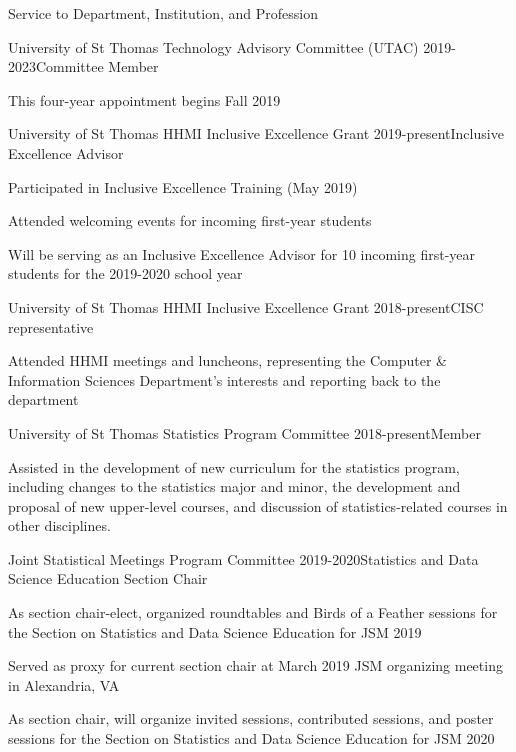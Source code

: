 \documentclass{resume} %
\begin{document}
\begin{rSection}{Service to Department, Institution, and Profession}

\begin{rSubsection}{University of St Thomas Technology Advisory Committee (UTAC)}{ }{2019-2023}{Committee Member}
\item This four-year appointment begins Fall 2019
\end{rSubsection}

\begin{rSubsection}{University of St Thomas HHMI Inclusive Excellence Grant}{ }{2019-present}{Inclusive Excellence Advisor}
\item Participated in Inclusive Excellence Training (May 2019)
\item Attended welcoming events for incoming first-year students
\item Will be serving as an Inclusive Excellence Advisor for 10 incoming first-year students for the 2019-2020 school year
\end{rSubsection}

\begin{rSubsection}{University of St Thomas HHMI Inclusive Excellence Grant}{ }{2018-present}{CISC representative}
\item Attended HHMI meetings and luncheons, representing the Computer \& Information Sciences Department's interests and reporting back to the department
\end{rSubsection}

\begin{rSubsection}{University of St Thomas Statistics Program Committee}{ }{2018-present}{Member}
\item Assisted in the development of new curriculum for the statistics program, including changes to the statistics major and minor, the development and proposal of new upper-level courses, and discussion of statistics-related courses in other disciplines. 
\end{rSubsection}

\begin{rSubsection}{Joint Statistical Meetings Program Committee}{ }{2019-2020}{Statistics and Data Science Education Section Chair}
\item As section chair-elect, organized roundtables and Birds of a Feather sessions for the Section on Statistics and Data Science Education for JSM 2019
\item Served as proxy for current section chair at March 2019 JSM organizing meeting in Alexandria, VA
\item As section chair, will organize invited sessions, contributed sessions, and poster sessions for the Section on Statistics and Data Science Education for JSM 2020
\end{rSubsection}


\end{rSection}
\end{document}
